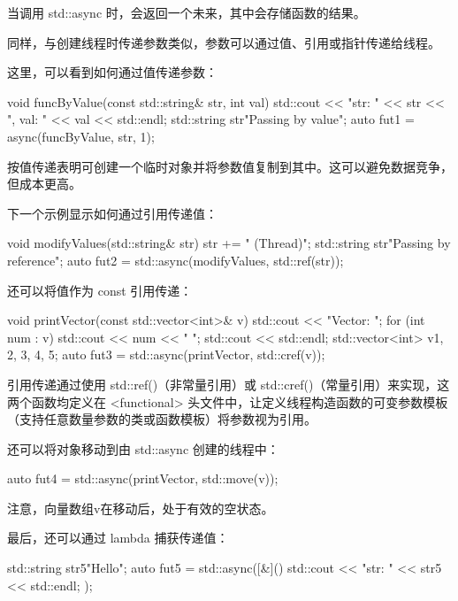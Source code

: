当调用 std::async 时，会返回一个未来，其中会存储函数的结果。


同样，与创建线程时传递参数类似，参数可以通过值、引用或指针传递给线程。

这里，可以看到如何通过值传递参数：

\begin{cpp}
void funcByValue(const std::string& str, int val) {
    std::cout << "str: " << str << ", val: " << val
              << std::endl;
}
std::string str{"Passing by value"};
auto fut1 = async(funcByValue, str, 1);
\end{cpp}

按值传递表明可创建一个临时对象并将参数值复制到其中。这可以避免数据竞争，但成本更高。

下一个示例显示如何通过引用传递值：

\begin{cpp}
void modifyValues(std::string& str) {
    str += " (Thread)";
}
std::string str{"Passing by reference"};
auto fut2 = std::async(modifyValues, std::ref(str));
\end{cpp}

还可以将值作为 const 引用传递：

\begin{cpp}
void printVector(const std::vector<int>& v) {
    std::cout << "Vector: ";
    for (int num : v) {
        std::cout << num << " ";
    }
    std::cout << std::endl;
}
std::vector<int> v{1, 2, 3, 4, 5};
auto fut3 = std::async(printVector, std::cref(v));
\end{cpp}

引用传递通过使用 std::ref()（非常量引用）或 std::cref()（常量引用）来实现，这两个函数均定义在 <functional> 头文件中，让定义线程构造函数的可变参数模板（支持任意数量参数的类或函数模板）将参数视为引用。

还可以将对象移动到由 std::async 创建的线程中：

\begin{cpp}
auto fut4 = std::async(printVector, std::move(v));
\end{cpp}

注意，向量数组v在移动后，处于有效的空状态。

最后，还可以通过 lambda 捕获传递值：

\begin{cpp}
std::string str5{"Hello"};
auto fut5 = std::async([&]() {
    std::cout << "str: " << str5 << std::endl;
});
\end{cpp}

